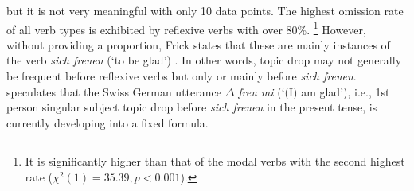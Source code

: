 %
but it is not very meaningful with only 10 data points.
The highest omission rate of all verb types is exhibited by reflexive verbs with over 80\%.%
\footnote{It is significantly higher than that of the modal verbs with the second highest rate ($\chi^2(1) = 35.39, p < 0.001$).}
%
However, without providing a proportion, Frick states that these are mainly instances of the verb \textit{sich freuen} (`to be glad') \citep[94]{frick2017}.
In other words, topic drop may not generally be frequent before reflexive verbs but only or mainly before \textit{sich freuen}.
\citet[95]{frick2017} speculates that the Swiss German utterance \textit{$\Delta$ freu mi} (`(I) am glad'), i.e., 1st person singular subject topic drop before \textit{sich freuen} in the present tense, is currently developing into a fixed formula.

